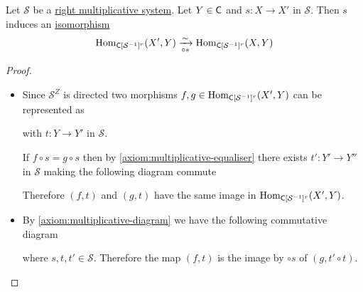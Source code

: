 \documentclass[../../main]{subfiles}
\begin{document}
\begin{lemma}\label{lemma:right-multiplicative-iso}
  Let \(\mathcal{S}\) be a \hyperref[def:multiplicative-system]{right multiplicative system}.
  Let \(Y \in \mathsf{C}\) and \(s: X \to X'\) in \(\mathcal{S}\).
  Then \(s\) induces an \hyperref[def:categorical-isomorphism]{isomorphism}
  \begin{equation*}
    \operatorname{Hom}_{\mathsf{C}[\mathcal{S}^{-1}]^{r}}(X', Y) \xrightarrow[\circ s]{\sim} \operatorname{Hom}_{\mathsf{C}[\mathcal{S}^{-1}]^{r}}(X, Y)
  \end{equation*}
\end{lemma}
\begin{proof}~
  \begin{itemize}
    \item[Injectivity] Since \(\mathcal{S}^{Z}\) is directed two morphisms \(f, g \in \operatorname{Hom}_{\mathsf{C}[\mathcal{S}^{-1}]^{r}}(X', Y)\) can be represented as
          \begin{center}
          \end{center}
          with \(t: Y \to Y'\) in \(\mathcal{S}\).
          
          If \(f \circ s = g \circ s\) then by \ref{axiom:multiplicative-equaliser} there exists \(t': Y' \to Y''\) in \(\mathcal{S}\) making the following diagram commute
          \begin{center}
          \end{center}
          Therefore \((f, t)\) and \((g, t)\) have the same image in \(\operatorname{Hom}_{\mathsf{C}[\mathcal{S}^{-1}]^{r}}(X', Y)\).
    \item[Surjectivity] By \ref{axiom:multiplicative-diagram} we have the following commutative diagram
          \begin{center}
          \end{center}
          where \(s, t, t' \in \mathcal{S}\).
          Therefore the map \((f, t)\) is the image by \(\circ s\) of \((g, t' \circ t)\).
  \end{itemize}
\end{proof}
\end{document}
